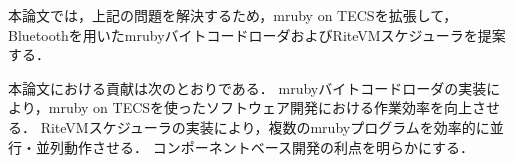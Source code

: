 \documentclass[submit,techrep]{ipsj}
\begin{document}
本論文では，上記の問題を解決するため，mruby on TECSを拡張して，Bluetoothを用いたmrubyバイトコードローダおよびRiteVMスケジューラを提案する．

本論文における貢献は次のとおりである．
mrubyバイトコードローダの実装により，mruby on TECSを使ったソフトウェア開発における作業効率を向上させる．
RiteVMスケジューラの実装により，複数のmrubyプログラムを効率的に並行・並列動作させる．
コンポーネントベース開発の利点を明らかにする．
\end{document}
